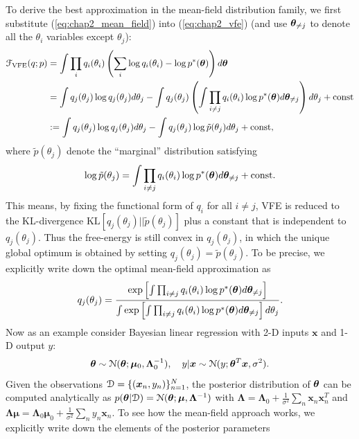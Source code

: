 To derive the best approximation in the mean-field distribution family, we first substitute (\ref{eq:chap2_mean_field}) into (\ref{eq:chap2_vfe}) (and use $\bm{\theta}_{\neq j}$ to denote all the $\theta_i$ variables except $\theta_j$):
\begin{equation*}
\begin{aligned}
\mathcal{F}_{\text{VFE}}(q; p) &=  \int \prod_i q_i(\theta_i)  \left( \sum_{i} \log q_i(\theta_i) - \log p^*(\bm{\theta})  \right) d\bm{\theta} \\
&= \int q_j(\theta_j) \log q_j(\theta_j) d\theta_j  - \int q_j(\theta_j) \left( \int \prod_{i \neq j} q_i(\theta_i)  \log p^*(\bm{\theta}) d\bm{\theta}_{\neq j} \right) d\theta_j + \text{const}\\
&:=  \int q_j(\theta_j) \log q_j(\theta_j) d\theta_j  - \int q_j(\theta_j) \log \tilde{p}(\theta_j) d\theta_j + \text{const},
\end{aligned}
\end{equation*}
where $\tilde{p}(\theta_j)$ denote the ``marginal'' distribution satisfying
\begin{equation*}
\log \tilde{p}(\theta_j) = \int \prod_{i \neq j} q_i(\theta_i) \log p^*(\bm{\theta}) d\bm{\theta}_{\neq j} + \text{const}.
\end{equation*}
This means, by fixing the functional form of $q_i$ for all $i \neq j$, VFE is reduced to the KL-divergence $\mathrm{KL}[q_j(\theta_j)||\tilde{p}(\theta_j)]$ plus a constant that is independent to $q_j(\theta_j)$. Thus the free-energy is still convex in $q_j(\theta_j)$, in which the unique global optimum is obtained by setting $q_j(\theta_j) = \tilde{p}(\theta_j)$. To be precise, we explicitly write down the optimal mean-field approximation as
\begin{equation}
q_j(\theta_j) = \frac{ \exp \left[ \int \prod_{i \neq j} q_i(\theta_i)  \log p^*(\bm{\theta}) d\bm{\theta}_{\neq j} \right] }{ \int \exp \left[ \int \prod_{i \neq j} q_i(\theta_i)  \log p^*(\bm{\theta}) d\bm{\theta}_{\neq j} \right] d\theta_j}.
\label{eq:chap2_mean_field_opt}
\end{equation}
%
Now as an example consider Bayesian linear regression with 2-D inputs $\bm{x}$ and 1-D output $y$:
\begin{equation*}
\bm{\theta} \sim \mathcal{N}(\bm{\theta}; \bm{\mu}_0, \bm{\Lambda}_0^{-1}), \quad 
y|\bm{x} \sim \mathcal{N}(y; \bm{\theta}^T \bm{x}, \sigma^2).
\end{equation*}
Given the observations $\mathcal{D} = \{ (\bm{x}_n, y_n) \}_{n=1}^N$, the posterior distribution of $\bm{\theta}$ can be computed analytically as $p(\bm{\theta}|\mathcal{D}) = \mathcal{N}(\bm{\theta}; \bm{\mu}, \bm{\Lambda}^{-1})$ with $\bm{\Lambda} = \bm{\Lambda}_0 + \frac{1}{\sigma^2} \sum_n \bm{x}_n \bm{x}_n^T$ and $\bm{\Lambda} \bm{\mu} = \bm{\Lambda}_0 \bm{\mu}_0 + \frac{1}{\sigma^2} \sum_n y_n \bm{x}_n$. To see how the mean-field approach works, we explicitly write down the elements of the posterior parameters
